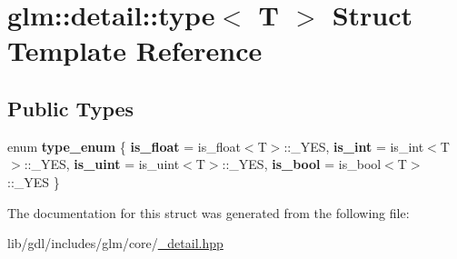 \hypertarget{structglm_1_1detail_1_1type}{}\section{glm\+:\+:detail\+:\+:type$<$ T $>$ Struct Template Reference}
\label{structglm_1_1detail_1_1type}
\subsection*{Public Types}
\begin{DoxyCompactItemize}
\item 
\hypertarget{structglm_1_1detail_1_1type_a487bcce5718802ac610a64921667e5d8}{}enum {\bfseries type\+\_\+enum} \{ {\bfseries is\+\_\+float} = is\+\_\+float$<$T$>$\+:\+:\+\_\+\+Y\+E\+S, 
{\bfseries is\+\_\+int} = is\+\_\+int$<$T$>$\+:\+:\+\_\+\+Y\+E\+S, 
{\bfseries is\+\_\+uint} = is\+\_\+uint$<$T$>$\+:\+:\+\_\+\+Y\+E\+S, 
{\bfseries is\+\_\+bool} = is\+\_\+bool$<$T$>$\+:\+:\+\_\+\+Y\+E\+S
 \}\label{structglm_1_1detail_1_1type_a487bcce5718802ac610a64921667e5d8}

\end{DoxyCompactItemize}


The documentation for this struct was generated from the following file\+:\begin{DoxyCompactItemize}
\item 
lib/gdl/includes/glm/core/\hyperlink{__detail_8hpp}{\+\_\+detail.\+hpp}\end{DoxyCompactItemize}
